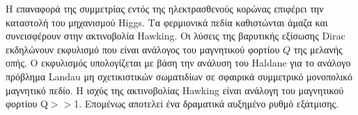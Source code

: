 \par Η επαναφορά της συμμετρίας εντός της ηλεκτρασθενούς κορώνας επιφέρει την καταστολή του μηχανισμού Higgs. Τα φερμιονικά πεδία καθιστώνται άμαζα και συνεισφέρουν στην ακτινοβολία Hawking. Οι λύσεις της βαρυτικής εξίσωσης Dirac εκδηλώνουν 
εκφυλισμό που είναι ανάλογος του μαγνητικού φορτίου $Q$ της μελανής οπής. Ο εκφυλισμός υπολογίζεται με βάση την ανάλυση του Haldane για το ανάλογο πρόβλημα Landau μη σχετικιστικών σωματιδίων σε σφαιρικά συμμετρικό μονοπολικό μαγνητικό πεδίο. Η ισχύς της ακτινοβολίας Hawking είναι ανάλογη του μαγνητικού φορτίου Q${\scriptstyle>>}$1. Επομένως αποτελεί ένα δραματικά αυξημένο ρυθμό εξάτμισης. 

